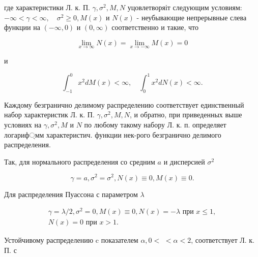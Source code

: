 \documentclass[10pt]{article}
\begin{document}
где характеристики Л. к. П. $\gamma, \sigma^{2}, M, N$ уцовлетворяіт следующим условиям: $-\infty<\gamma<\infty, \quad \sigma^{2} \geqslant 0, M(x)$ и $N(x)$ - неубывающие непрерывные слева функции на $(-\infty, 0)$ и $(0, \infty)$ соответственно и такие, что



\[

\lim _{x \rightarrow \infty} N(x)=\lim _{x \rightarrow-\infty} M(x)=0

\]



и



\[

\int_{-1}^{0} x^{2} d M(x)<\infty, \quad \int_{0}^{1} x^{2} d N(x)<\infty .

\]



Каждому безгранично делимому распределению соответствует единственный набор характеристик Л. к. П. $\gamma, \sigma^{2}, M, N$, и обратно, при приведенных выше условиях на $\gamma, \sigma^{2}, M$ и $N$ по любому такому набору Л. к. п. определяет логариф্мм характеристич. функции нек-рого безгранично делимого распределения.



Так, для нормального распределения со средним $a$ и дисперсией $\sigma^{2}$



\[

\gamma=a, \sigma^{2}=\sigma^{2}, N(x) \equiv 0, M(x) \equiv 0 .

\]



Для распределения Пуассона с параметром $\lambda$



\[

\begin{gathered}

\gamma=\lambda / 2, \sigma^{2}=0, M(x) \equiv 0, N(x)=-\lambda \text { при } x \leqslant 1, \\

N(x)=0 \text { при } x>1 .

\end{gathered}

\]



Устойчивому распределению $\mathrm{c}$ показателем $\alpha, 0<$ $<\alpha<2$, соответствует Л. к. П. с
\end{document}
